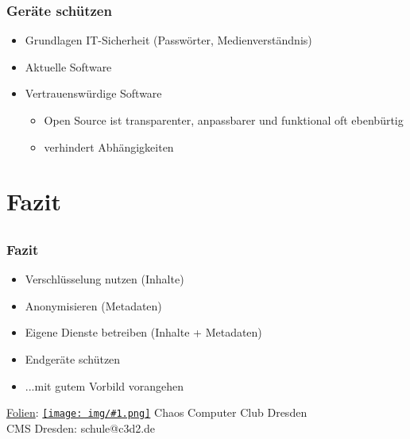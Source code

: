\documentclass[12pt]{beamer}
\newcommand{\cc}[1]{\texttt{[image: img/\#1.png]}\hspace{1mm}}
\begin{document}
\begin{frame}
  \frametitle{Geräte schützen}
  \begin{itemize}
    \item<1-> Grundlagen IT-Sicherheit (Passwörter, Medienverständnis)
    \item<2-> Aktuelle Software
    \item<3-> Vertrauenswürdige Software
    \begin{itemize}
      \item<4-> Open Source ist transparenter, anpassbarer und funktional oft ebenbürtig
      \item<5-> verhindert Abhängigkeiten
    \end{itemize}
  \end{itemize}
\end{frame}

\section{Fazit}
\subsection{}

\begin{frame}
  \frametitle{Fazit}
  \begin{center}
    \begin{itemize}
      \item Verschlüsselung nutzen (Inhalte)
      \item Anonymisieren (Metadaten)
      \item Eigene Dienste betreiben (Inhalte + Metadaten)
      \item Endgeräte schützen
      \item<2-> ...mit gutem Vorbild vorangehen
    \end{itemize}

    \vspace{5mm}
    \href{https://github.com/c3d2/cms-nsa}{Folien}: \href{https://creativecommons.org/licenses/by-sa/4.0/}{\cc{by-sa}} Chaos Computer Club Dresden \\
    \vspace{4mm}
    CMS Dresden: schule@c3d2.de
  \end{center}
\end{frame}
\end{document}
